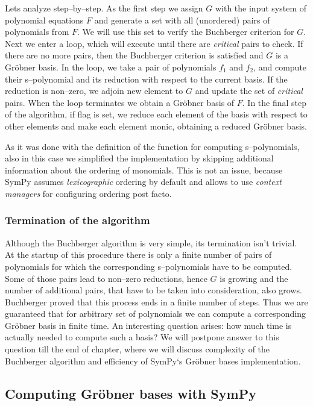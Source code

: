 \noindent
Lets analyze  step--by--step. As the first step we assign $G$ with the input
system of polynomial equations $F$ and generate a set with all (unordered) pairs of polynomials
from $F$. We will use this set to verify the Buchberger criterion for $G$. Next we enter a loop,
which will execute until there are \emph{critical} pairs to check. If there are no more pairs, then
the Buchberger criterion is satisfied and $G$ is a Gröbner basis. In the loop, we take a pair
of polynomials $f_1$ and $f_2$, and compute their s--polynomial and its reduction with respect
to the current basis. If the reduction is non--zero, we adjoin new element to $G$ and update
the set of \emph{critical} pairs. When the loop terminates we obtain a Gröbner basis of $F$. In
the final step of the algorithm, if  flag is set, we reduce each element of the basis
with respect to other elements and make each element monic, obtaining a reduced Gröbner basis.

As it was done with the definition of the function for computing s--polynomials, also in this case
we simplified the implementation by skipping additional information about the ordering of monomials.
This is not an issue, because SymPy assumes \emph{lexicographic} ordering by default and allows to use
\emph{context managers} for configuring ordering post facto.


\subsubsection{Termination of the algorithm}

Although the Buchberger algorithm is very simple, its termination isn't trivial. At the startup
of this procedure there is only a finite number of pairs of polynomials for which the corresponding
s--polynomials have to be computed. Some of those pairs lead to non--zero reductions, hence $G$ is
growing and the number of additional pairs, that have to be taken into consideration, also grows.
Buchberger proved that this process ends in a finite number of steps. Thus we are guaranteed that
for arbitrary set of polynomials we can compute a corresponding Gröbner basis in finite time.
An interesting question arises: how much time is actually needed to compute such a basis? We will
postpone answer to this question till the end of chapter, where we will discuss complexity of the
Buchberger algorithm and efficiency of SymPy`s Gröbner bases implementation.


\subsection{Computing Gröbner bases with SymPy}

